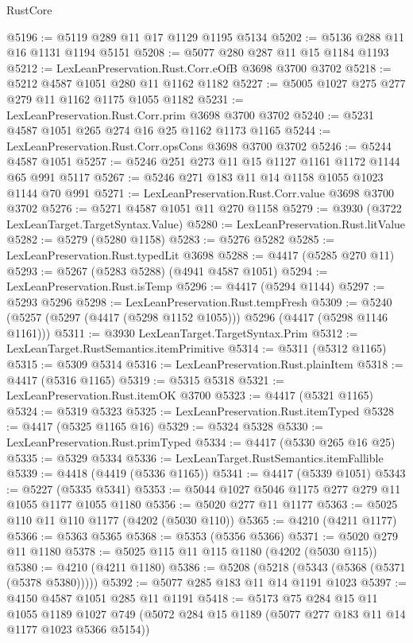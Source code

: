 \begin{lexlean}{RustCore}
\begin{coremodule}
@5196 := @5119 @289 @11 @17 @1129 @1195 @5134
@5202 := @5136 @288 @11 @16 @1131 @1194 @5151
@5208 := @5077 @280 @287 @11 @15 @1184 @1193
@5212 := LexLeanPreservation.Rust.Corr.eOfB @3698 @3700 @3702
@5218 := @5212 @4587 @1051 @280 @11 @1162 @1182
@5227 := @5005 @1027 @275 @277 @279 @11 @1162 @1175 @1055 @1182
@5231 := LexLeanPreservation.Rust.Corr.prim @3698 @3700 @3702
@5240 := @5231 @4587 @1051 @265 @274 @16 @25 @1162 @1173 @1165
@5244 := LexLeanPreservation.Rust.Corr.opsCons @3698 @3700 @3702
@5246 := @5244 @4587 @1051
@5257 := @5246 @251 @273 @11 @15 @1127 @1161 @1172 @1144 @65 @991 @5117
@5267 := @5246 @271 @183 @11 @14 @1158 @1055 @1023 @1144 @70 @991
@5271 := LexLeanPreservation.Rust.Corr.value @3698 @3700 @3702
@5276 := @5271 @4587 @1051 @11 @270 @1158
@5279 := @3930 (@3722 LexLeanTarget.TargetSyntax.Value)
@5280 := LexLeanPreservation.Rust.litValue
@5282 := @5279 (@5280 @1158)
@5283 := @5276 @5282
@5285 := LexLeanPreservation.Rust.typedLit @3698
@5288 := @4417 (@5285 @270 @11)
@5293 := @5267 (@5283 @5288) (@4941 @4587 @1051)
@5294 := LexLeanPreservation.Rust.isTemp
@5296 := @4417 (@5294 @1144)
@5297 := @5293 @5296
@5298 := LexLeanPreservation.Rust.tempFresh
@5309 := @5240 (@5257 (@5297 (@4417 (@5298 @1152 @1055))) @5296 (@4417 (@5298 @1146 @1161)))
@5311 := @3930 LexLeanTarget.TargetSyntax.Prim
@5312 := LexLeanTarget.RustSemantics.itemPrimitive
@5314 := @5311 (@5312 @1165)
@5315 := @5309 @5314
@5316 := LexLeanPreservation.Rust.plainItem
@5318 := @4417 (@5316 @1165)
@5319 := @5315 @5318
@5321 := LexLeanPreservation.Rust.itemOK @3700
@5323 := @4417 (@5321 @1165)
@5324 := @5319 @5323
@5325 := LexLeanPreservation.Rust.itemTyped
@5328 := @4417 (@5325 @1165 @16)
@5329 := @5324 @5328
@5330 := LexLeanPreservation.Rust.primTyped
@5334 := @4417 (@5330 @265 @16 @25)
@5335 := @5329 @5334
@5336 := LexLeanTarget.RustSemantics.itemFallible
@5339 := @4418 (@4419 (@5336 @1165))
@5341 := @4417 (@5339 @1051)
@5343 := @5227 (@5335 @5341)
@5353 := @5044 @1027 @5046 @1175 @277 @279 @11 @1055 @1177 @1055 @1180
@5356 := @5020 @277 @11 @1177
@5363 := @5025 @110 @11 @110 @1177 (@4202 (@5030 @110))
@5365 := @4210 (@4211 @1177)
@5366 := @5363 @5365
@5368 := @5353 (@5356 @5366)
@5371 := @5020 @279 @11 @1180
@5378 := @5025 @115 @11 @115 @1180 (@4202 (@5030 @115))
@5380 := @4210 (@4211 @1180)
@5386 := @5208 (@5218 (@5343 (@5368 (@5371 (@5378 @5380)))))
@5392 := @5077 @285 @183 @11 @14 @1191 @1023
@5397 := @4150 @4587 @1051 @285 @11 @1191
@5418 := @5173
    @75
    @284
    @15
    @11
    @1055
    @1189
    @1027
    @749
    (@5072 @284 @15 @1189 (@5077 @277 @183 @11 @14 @1177 @1023 @5366 @5154))

\end{coremodule}
\end{lexlean}
